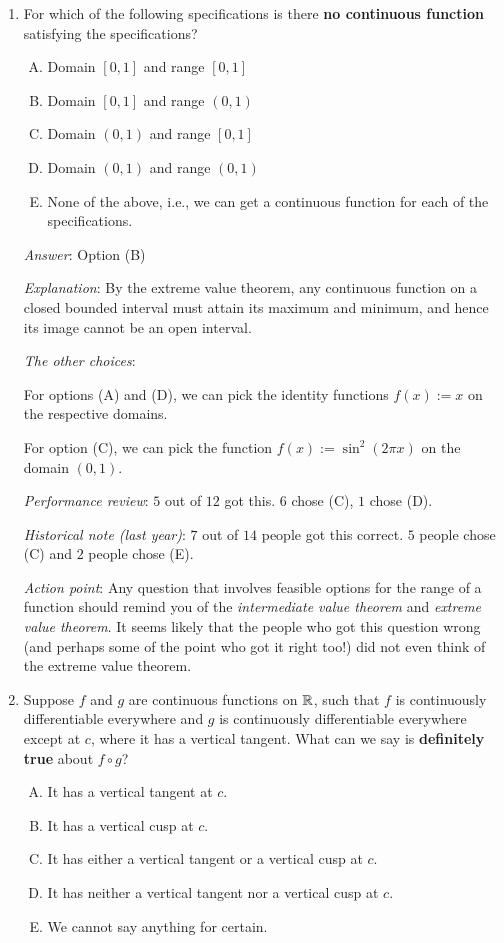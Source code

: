 \documentclass[10pt]{amsart}
\begin{document}
\begin{enumerate}
\item For which of the following specifications is there {\bf no
  continuous function} satisfying the specifications?

  \begin{enumerate}[(A)]
  \item Domain $[0,1]$ and range $[0,1]$
  \item Domain $[0,1]$ and range $(0,1)$
  \item Domain $(0,1)$ and range $[0,1]$
  \item Domain $(0,1)$ and range $(0,1)$
  \item None of the above, i.e., we can get a continuous function for
    each of the specifications.
  \end{enumerate}

  {\em Answer}: Option (B)

  {\em Explanation}: By the extreme value theorem, any continuous
  function on a closed bounded interval must attain its maximum and
  minimum, and hence its image cannot be an open interval.

  {\em The other choices}:

  For options (A) and (D), we can pick the identity functions $f(x) :=
  x$ on the respective domains.

  For option (C), we can pick the function $f(x) := \sin^2(2\pi x)$ on
  the domain $(0,1)$. 

  {\em Performance review}: $5$ out of $12$ got this. $6$ chose (C),
  $1$ chose (D).

  {\em Historical note (last year)}: $7$ out of $14$ people got this
  correct. $5$ people chose (C) and $2$ people chose (E).

  {\em Action point}: Any question that involves feasible options for
  the range of a function should remind you of the {\em intermediate
  value theorem} and {\em extreme value theorem}. It seems likely that
  the people who got this question wrong (and perhaps some of the
  point who got it right too!) did not even think of the extreme value
  theorem.
\item Suppose $f$ and $g$ are continuous functions on $\mathbb{R}$, such that
  $f$ is continuously differentiable everywhere and $g$ is
  continuously differentiable everywhere except at $c$, where it has a
  vertical tangent. What can we say is {\bf definitely true} about $f
  \circ g$?

  \begin{enumerate}[(A)]
  \item It has a vertical tangent at $c$.
  \item It has a vertical cusp at $c$.
  \item It has either a vertical tangent or a vertical cusp at $c$.
  \item It has neither a vertical tangent nor a vertical cusp at $c$.
  \item We cannot say anything for certain.
  \end{enumerate}


\end{enumerate}
\end{document}

